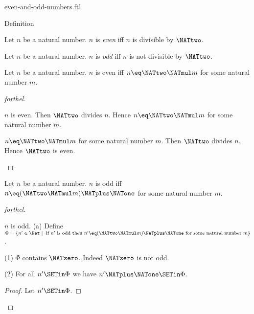 \documentclass{stex}
\begin{document}
\begin{smodule}{even-and-odd-numbers.ftl}

\begin{sfragment}{Definition}
  \begin{definition}[forthel,id=ARITHMETIC_15_4521358965847512]
    Let $n$ be a natural number.
    $n$ is \emph{even} iff $n$ is divisible by $\NATtwo$.
  \end{definition}

  \begin{definition}[forthel,id=ARITHMETIC_15_1023652125874596]
    Let $n$ be a natural number.
    $n$ is \emph{odd} iff $n$ is not divisible by $\NATtwo$.
  \end{definition}

  \begin{proposition}[forthel,id=ARITHMETIC_15_0236985458752156]
    Let $n$ be a natural number.
    $n$ is even iff $n \eq \NATtwo \NATmul m$ for some natural number $m$.
  \end{proposition}
  \begin{proof}[forthel]
    \begin{case}{$n$ is even.}
      Then $\NATtwo$ divides $n$.
      Hence $n \eq \NATtwo \NATmul m$ for some natural number $m$.
    \end{case}

    \begin{case}{$n \eq \NATtwo \NATmul m$ for some natural number $m$.}
      Then $\NATtwo$ divides $n$.
      Hence $\NATtwo$ is even.
    \end{case}
  \end{proof}

  \begin{proposition}[forthel,id=ARITHMETIC_15_1023512547854265]
    Let $n$ be a natural number.
    $n$ is odd iff $n \eq (\NATtwo \NATmul m) \NATplus \NATone$ for some natural number $m$.
  \end{proposition}
  \begin{proof}[forthel]
    \begin{case}{$n$ is odd.}
      (a) Define $\Phi = \{ n' \in \Nat \mid \text{ if }n'\text{ is odd then }n' \eq (\NATtwo \NATmul m) \NATplus \NATone\text{ for some natural number }m \}$.

      (1) $\Phi$ contains $\NATzero$.
      Indeed $\NATzero$ is not odd.

      (2) For all $n' \SETin \Phi$ we have $n' \NATplus \NATone \SETin \Phi$. 
      \begin{proof}
        Let $n' \SETin \Phi$.


\end{proof}
\end{case}
\end{proof}
\end{sfragment}
\end{smodule}
\end{document}
